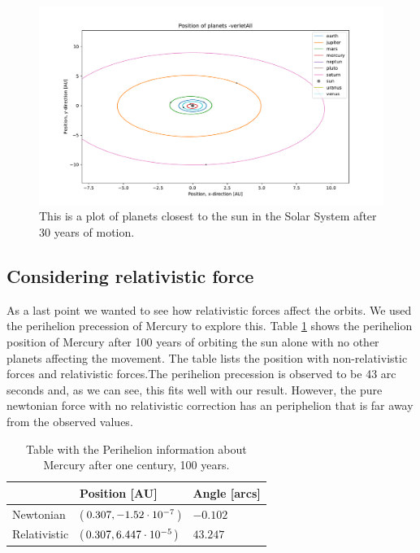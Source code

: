 \begin{figure}[H]
\includegraphics[width=1\linewidth]{../results/plots/innerplanets-verletAll.pdf}\caption{This is a plot of planets closest to the sun in the Solar System after 30 years of motion.}\label{fig:solarsystem_innerplanets}
\end{figure}
	
\subsection{Considering relativistic force}
	
As a last point we wanted to see how relativistic forces affect the orbits. We used the perihelion precession of Mercury to explore this. Table \ref{tab:Perihelion} shows the perihelion position of Mercury after 100 years of orbiting the sun alone with no other planets affecting the movement. The table lists the position with non-relativistic forces and relativistic forces.The perihelion precession is observed to be 43 arc seconds and, as we can see, this fits well with our result. However, the pure newtonian force with no relativistic correction has an periphelion that is far away from the observed values.
	
\begin{table}[H]\caption{Table with the Perihelion information about Mercury after one century, 100 years. }\label{tab:Perihelion}
  \begin{tabular}{lll} 
    & Position [AU] & Angle [arcs]\\ \hline 
    Newtonian &($0.307,  -1.52\cdot 10^{-7} $)& $  -0.102 $\\ 
    Relativistic & ($ 0.307, 6.447\cdot 10^{-5} $)  &$ 43.247 $ \\ 
\end{tabular}
\end{table}
